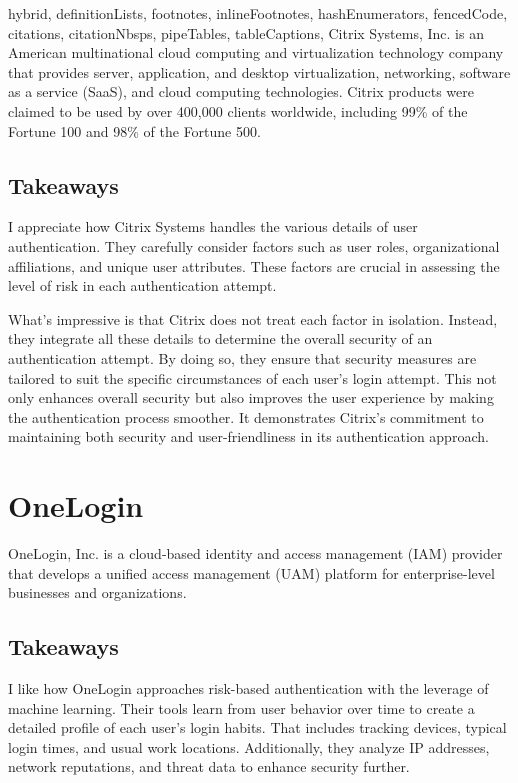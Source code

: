 \documentclass[
  digital,     %
  oneside,     %
  nosansbold,  %
  nocolorbold, %
  lof,         %
  lot,         %
]{fithesis4}
\begin{document}
\begin{markdown*}{%
  hybrid,
  definitionLists,
  footnotes,
  inlineFootnotes,
  hashEnumerators,
  fencedCode,
  citations,
  citationNbsps,
  pipeTables,
  tableCaptions,
}
Citrix Systems, Inc. is an American multinational cloud computing and virtualization technology company that provides server, application, and desktop virtualization, networking, software as a service (SaaS), and cloud computing technologies.
Citrix products were claimed to be used by over 400,000 clients worldwide, including 99\% of the Fortune 100 and 98\% of the Fortune 500.

\subsection{Takeaways}
I appreciate how Citrix Systems handles the various details of user authentication.
They carefully consider factors such as user roles, organizational affiliations, and unique user attributes.
These factors are crucial in assessing the level of risk in each authentication attempt.

What's impressive is that Citrix does not treat each factor in isolation.
Instead, they integrate all these details to determine the overall security of an authentication attempt.
By doing so, they ensure that security measures are tailored to suit the specific circumstances of each user's login attempt. This not only enhances overall security but also improves the user experience by making the authentication process smoother.
It demonstrates Citrix's commitment to maintaining both security and user-friendliness in its authentication approach.\cite{existing-citrix-wiki} \cite{existing-citrix-blog}


\newpage
\section{OneLogin}

OneLogin, Inc. is a cloud-based identity and access management (IAM) provider that develops a unified access management (UAM) platform for enterprise-level businesses and organizations. \cite{existing-onelogin}

\subsection{Takeaways}
I like how OneLogin approaches risk-based authentication with the leverage of machine learning. 
Their tools learn from user behavior over time to create a detailed profile of each user's login habits.
That includes tracking devices, typical login times, and usual work locations.
Additionally, they analyze IP addresses, network reputations, and threat data to enhance security further.


\end{markdown*}
\end{document}
